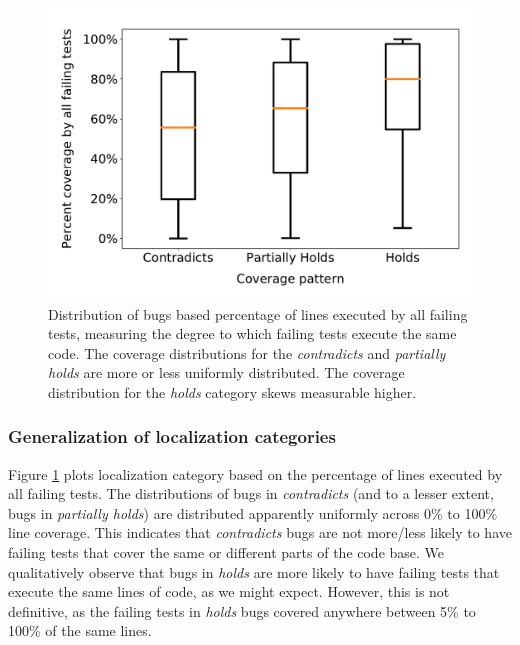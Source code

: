 \documentclass[10pt,journal,compsoc]{IEEEtran}
\newcommand\todo[1]{\textcolor{red}{#1}}
\begin{document}
\begin{figure}
  \includegraphics[width=\linewidth,left]{img/coverage-buggy.pdf}
  \caption{\small \label{fig:coverage-buggy} Distribution of bugs based percentage of lines 
  executed by all failing tests, measuring the degree to which failing tests execute the same 
  code. The coverage distributions for the \emph{contradicts} and \emph{partially holds} are more or 
  less uniformly distributed. The coverage
  distribution for the \emph{holds} category skews measurable higher. 
      } %
\end{figure}

\subsubsection{Generalization of localization categories}
Figure \ref{fig:coverage-buggy} plots localization category based on the
percentage of lines executed by all failing tests. 
%
The distributions of bugs in \emph{contradicts} (and to a lesser extent, bugs in \emph{partially 
holds}) are 
distributed apparently uniformly across 0\% to 100\% line coverage. This indicates that \emph{contradicts} 
bugs are 
not more/less likely to have failing tests that cover the same or different parts of the code 
base.
%
We qualitatively observe that bugs in \emph{holds} are more likely to have 
failing tests that execute the same lines of code, as we might expect. However, this is not 
definitive, as the failing tests in \emph{holds} bugs covered anywhere between 
5\% to 100\% of the same lines.
\end{document}
